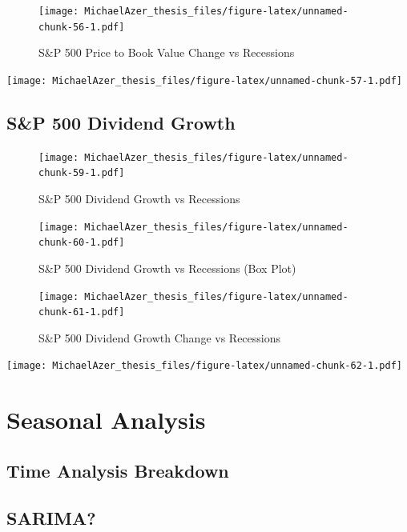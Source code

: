 \documentclass[]{book}
\begin{document}
\begin{figure}
\centering
\texttt{[image: MichaelAzer\_thesis\_files/figure-latex/unnamed-chunk-56-1.pdf]}
\caption{\label{fig:unnamed-chunk-56}\label{fig:figs}S\&P 500 Price to Book Value Change vs Recessions}
\end{figure}

\texttt{[image: MichaelAzer\_thesis\_files/figure-latex/unnamed-chunk-57-1.pdf]}

\hypertarget{sp-500-dividend-growth}{%
\subsection{S\&P 500 Dividend Growth}\label{sp-500-dividend-growth}}

\begin{figure}
\centering
\texttt{[image: MichaelAzer\_thesis\_files/figure-latex/unnamed-chunk-59-1.pdf]}
\caption{\label{fig:unnamed-chunk-59}\label{fig:figs}S\&P 500 Dividend Growth vs Recessions}
\end{figure}

\begin{figure}
\centering
\texttt{[image: MichaelAzer\_thesis\_files/figure-latex/unnamed-chunk-60-1.pdf]}
\caption{\label{fig:unnamed-chunk-60}\label{fig:figs}S\&P 500 Dividend Growth vs Recessions (Box Plot)}
\end{figure}

\begin{figure}
\centering
\texttt{[image: MichaelAzer\_thesis\_files/figure-latex/unnamed-chunk-61-1.pdf]}
\caption{\label{fig:unnamed-chunk-61}\label{fig:figs}S\&P 500 Dividend Growth Change vs Recessions}
\end{figure}

\texttt{[image: MichaelAzer\_thesis\_files/figure-latex/unnamed-chunk-62-1.pdf]}

\hypertarget{seasonal-analysis}{%
\section{Seasonal Analysis}\label{seasonal-analysis}}

\hypertarget{time-analysis-breakdown}{%
\subsection{Time Analysis Breakdown}\label{time-analysis-breakdown}}

\hypertarget{sarima}{%
\subsection{SARIMA?}\label{sarima}}
\end{document}
